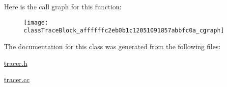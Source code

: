 Here is the call graph for this function\-:
\nopagebreak
\begin{figure}[H]
\begin{center}
\leavevmode
\texttt{[image: classTraceBlock\_affffffc2eb0b1c12051091857abbfc0a\_cgraph]}
\end{center}
\end{figure}




The documentation for this class was generated from the following files\-:\begin{DoxyCompactItemize}
\item 
\hyperlink{tracer_8h}{tracer.\-h}\item 
\hyperlink{tracer_8cc}{tracer.\-cc}\end{DoxyCompactItemize}
